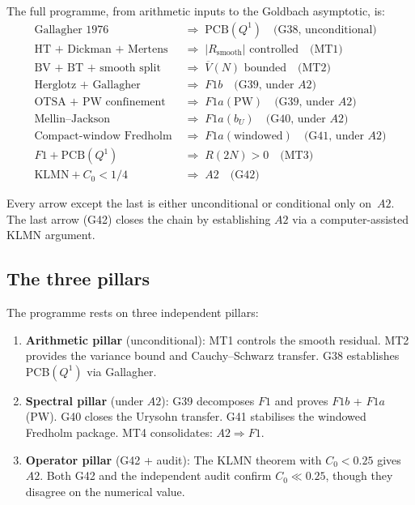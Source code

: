 \documentclass[11pt,a4paper]{article}
\begin{document}
The full programme, from arithmetic inputs to the Goldbach asymptotic, is:
\begin{align*}
\text{Gallagher 1976} &\;\Longrightarrow\; \text{PCB}(Q^1) \quad\text{(G38, unconditional)} \\
\text{HT + Dickman + Mertens} &\;\Longrightarrow\; |R_{\text{smooth}}| \text{ controlled} \quad\text{(MT1)} \\
\text{BV + BT + smooth split} &\;\Longrightarrow\; \overline{V}(N) \text{ bounded} \quad\text{(MT2)} \\
\text{Herglotz + Gallagher} &\;\Longrightarrow\; F1b \quad\text{(G39, under }A2\text{)} \\
\text{OTSA + PW confinement} &\;\Longrightarrow\; F1a(\text{PW}) \quad\text{(G39, under }A2\text{)} \\
\text{Mellin--Jackson} &\;\Longrightarrow\; F1a(b_U) \quad\text{(G40, under }A2\text{)} \\
\text{Compact-window Fredholm} &\;\Longrightarrow\; F1a(\text{windowed}) \quad\text{(G41, under }A2\text{)} \\
F1 + \text{PCB}(Q^1) &\;\Longrightarrow\; R(2N)>0 \quad\text{(MT3)} \\
\text{KLMN} + C_0 < 1/4 &\;\Longrightarrow\; A2 \quad\text{(G42)}
\end{align*}

Every arrow except the last is either unconditional or conditional only on~$A2$.  The last arrow (G42) closes the chain by establishing $A2$ via a computer-assisted KLMN argument.

\subsection{The three pillars}

The programme rests on three independent pillars:

\begin{enumerate}
    \item \textbf{Arithmetic pillar} (unconditional): MT1 controls the smooth residual.  MT2 provides the variance bound and Cauchy--Schwarz transfer.  G38 establishes PCB$(Q^1)$ via Gallagher.

    \item \textbf{Spectral pillar} (under $A2$): G39 decomposes $F1$ and proves $F1b$ + $F1a$(PW).  G40 closes the Urysohn transfer.  G41 stabilises the windowed Fredholm package.  MT4 consolidates: $A2\Rightarrow F1$.

    \item \textbf{Operator pillar} (G42 + audit): The KLMN theorem with $C_0 < 0.25$ gives $A2$.  Both G42 and the independent audit confirm $C_0\ll 0.25$, though they disagree on the numerical value.
\end{enumerate}
\end{document}
